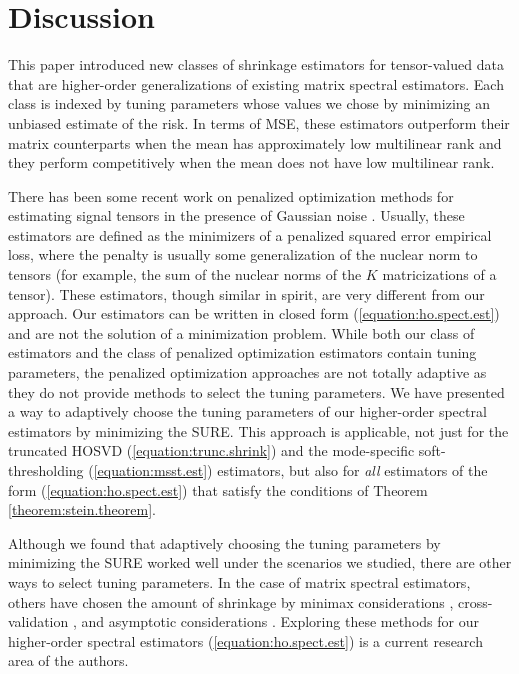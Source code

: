 \section{Discussion}
\label{sec:discussion}

This paper introduced new classes of shrinkage estimators for tensor-valued data that are higher-order generalizations of existing matrix spectral estimators. Each class is indexed by tuning parameters whose values we chose by minimizing an unbiased estimate of the risk. In terms of MSE, these estimators outperform their matrix counterparts when the mean has approximately low multilinear rank and they perform competitively when the mean does not have low multilinear rank.

There has been some recent work on penalized optimization methods for estimating signal tensors in the presence of Gaussian noise \citep{signoretto2010convex,tomioka2011estimation,tomioka2011statistical,liu2013tensor,tomioka2013convex}. Usually, these estimators are defined as the minimizers of a penalized squared error empirical loss, where the penalty is usually some generalization of the nuclear norm to tensors (for example, the sum of the nuclear norms of the $K$ matricizations of a tensor). These estimators, though similar in spirit, are very different from our approach. Our estimators can be written in closed form (\ref{equation:ho.spect.est}) and are not the solution of a minimization problem. While both our class of estimators and the class of penalized optimization estimators contain tuning parameters, the penalized optimization approaches are not totally adaptive as they do not provide methods to select the tuning parameters. We have presented a way to adaptively choose the tuning parameters of our higher-order spectral estimators by minimizing the SURE. This approach is applicable, not just for the truncated HOSVD (\ref{equation:trunc.shrink}) and the mode-specific soft-thresholding (\ref{equation:msst.est}) estimators, but also for \emph{all} estimators of the form (\ref{equation:ho.spect.est}) that satisfy the conditions of Theorem \ref{theorem:stein.theorem}.

Although we found that adaptively choosing the tuning parameters by minimizing the SURE worked well under the scenarios we studied, there are other ways to select tuning parameters. In the case of matrix spectral estimators, others have chosen the amount of shrinkage by minimax considerations \citep{efron1972empirical,stein1981estimation}, cross-validation \citep{bro2008cross,owen2009bi,josse2012selecting}, and asymptotic considerations \citep{gavish2014optimalhard,gavish2014optimal}. Exploring these methods for our higher-order spectral estimators (\ref{equation:ho.spect.est}) is a current research area of the authors.


